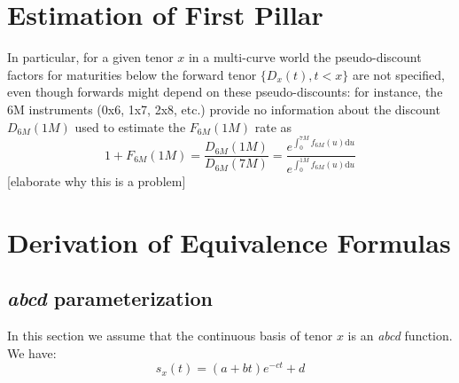 \documentclass{article}
\begin{document}
\newpage
\appendix
\begin{appendices}
\section{Estimation of First Pillar}

In particular, for a given tenor $x$ in a multi-curve world the pseudo-discount factors for maturities below the forward tenor $\{D_x(t), t<x \}$ are not specified, even though forwards might depend on these 
pseudo-discounts: for instance, the 6M instruments (0x6, 1x7, 2x8, etc.) provide no information about the discount $D_{6M}(1M)$ used to estimate the $F_{6M}(1M)$ rate as
\begin{equation}
1+F_{6M}(1M) = \frac{D_{6M}(1M)}{D_{6M}(7M)} = \frac{e^{\int_0^{7M} f_{6M}(u)\mathrm{d}u}}{e^{\int_0^{1M} f_{6M}(u)\mathrm{d}u}}
\end{equation}
[elaborate why this is a problem]


\section{Derivation of Equivalence Formulas}

\subsection{\textit{abcd} parameterization}

In this section we assume that the continuous basis of tenor $x$ is an \textit{abcd} function. We have:
\begin{equation}
s_x(t) = (a + b t)e^{-c  t} + d
\end{equation}


\end{appendices}
\end{document}
